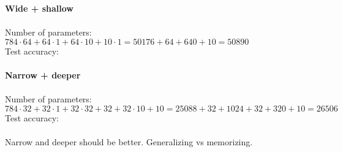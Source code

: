 \documentclass{article}
\newcommand{\1}{\mathbf{1}}
\begin{document}
{\textbf{Wide + shallow} \\ \\
Number of parameters: $784 \cdot 64 + 64 \cdot 1 + 64 \cdot 10 + 10 \cdot 1 = 50176 + 64 + 640 + 10 = 50890$  \\
Test accuracy: \\ \\
\textbf{Narrow + deeper} \\ \\
Number of parameters: $784 \cdot 32 + 32 \cdot 1 + 32 \cdot 32 + 32 + 32 \cdot 10 + 10 = 25088 + 32 + 1024 + 32 + 320 + 10 = 26506$  \\
Test accuracy: \\ \\
Narrow and deeper should be better. Generalizing vs memorizing.

}
\end{document}
